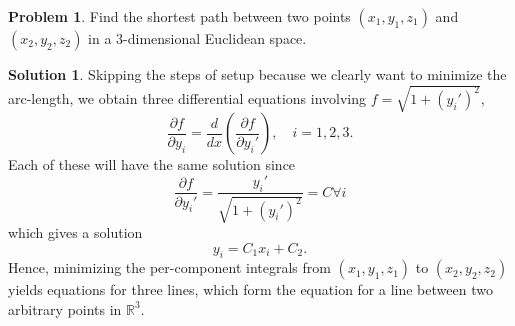 \documentclass[10pt]{article}
\theoremstyle{definition}
\newtheorem{problem}{Problem}
\newtheorem{soln}{Solution}
\begin{document}
\begin{problem}
Find the shortest path between two points $(x_1, y_1, z_1)$ and $(x_2, y_2, z_2)$ in a 3-dimensional
Euclidean space.
\end{problem}
\begin{soln}
Skipping the steps of setup because we clearly want to minimize the arc-length,
we obtain three differential equations involving $f=\sqrt{1+(y_i')^2}$,
$$\frac{\partial f}{\partial y_i}=\frac{d}{dx}\left(\frac{\partial f}{\partial y_i'}\right),\quad i=1,2,3.$$
Each of these will have the same solution since 
$$\frac{\partial f}{\partial y_i'}=\frac{y_i'}{\sqrt{1+(y_i')^2}}=C\forall i$$
which gives a solution 
$$y_i=C_1x_i+C_2.$$
Hence, minimizing the per-component integrals from $(x_1, y_1, z_1)$ to $(x_2, y_2, z_2)$ yields equations for three lines,
which form the equation for a line between two arbitrary points in $\mathbb{R}^3$.
\end{soln}
\end{document}
